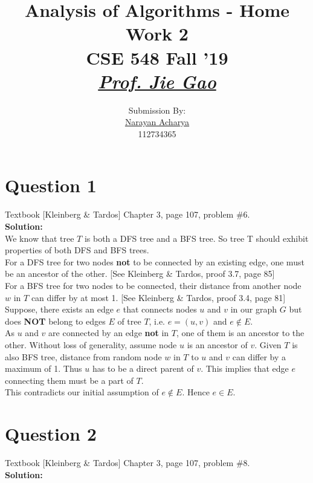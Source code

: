 \documentclass[11pt]{article}
\title{
	Analysis of Algorithms - Home Work 2\\[2mm]
	\large CSE 548 Fall '19\\[1mm]
	\href{mailto:jgao@cs.stonybrook.edu}{\textit{Prof. Jie Gao}}
}
\author{
	\small Submission By: \\
	\href{mailto:nacharya@cs.stonybrook.edu}{Narayan Acharya} \\
	\small 112734365
}
\date{\vspace{-5ex}}
\begin{document}
\maketitle
\thispagestyle{fancy} %

\tableofcontents

\clearpage

\section{Question 1} Textbook [Kleinberg \& Tardos] Chapter 3, page 107, problem \#6. \\
\textbf{Solution:} \\

We know that tree $ T $ is both a DFS tree and a BFS tree. So tree T should exhibit properties of both DFS and BFS trees. \\

For a DFS tree for two nodes \textbf{not} to be connected by an existing edge, one must be an ancestor of the other. [See Kleinberg \& Tardos, proof 3.7, page 85] \\

For a BFS tree for two nodes to be connected, their distance from another node $ w $ in $ T $ can differ by at most 1. [See Kleinberg \& Tardos, proof 3.4, page 81] \\

Suppose, there exists an edge $ e $ that connects nodes $ u $ and $ v $ in our graph $ G $ but does \textbf{NOT} belong to edges $ E $ of tree $ T $, i.e. $ e=(u,v) $ and $ e \notin E $. \\

As $ u $ and $ v $ are connected by an edge \textbf{not} in $ T $, one of them is an ancestor to the other. Without loss of generality, assume node $ u $ is an ancestor of $ v $. Given $ T $ is also BFS tree, distance from random node $ w $ in $ T $ to $ u $ and $ v $ can differ by a maximum of 1. Thus $ u $ has to be a direct parent of $ v $. This implies that edge $ e $ connecting them must be a part of $ T $. \\

This contradicts our initial assumption of $ e \notin E $. Hence $ e \in E $.
   
\clearpage
\section{Question 2} Textbook [Kleinberg \& Tardos] Chapter 3, page 107, problem \#8. \\
\textbf{Solution:} \\
\end{document}

